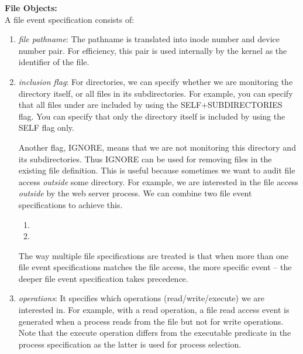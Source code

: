 

\noindent
{\bf File Objects:} \\
A file event specification consists of:
\begin{enumerate}

\item {\em file pathname}:
The pathname is translated into inode number and device number pair.
For efficiency, this pair is used internally by the kernel as
the identifier of the file.

\item {\em inclusion flag}:
For directories, we can specify whether
we are monitoring the directory itself, or all files in its subdirectories.
For example, you can specify that all files under 
are included by using the SELF+SUBDIRECTORIES flag.
You can specify that only the  directory itself
is included by using the SELF flag only.

Another flag, IGNORE, means that we
are not monitoring this directory and its subdirectories.
Thus IGNORE can be used for removing files in the existing file definition.
This is useful because sometimes we want to audit file access
{\em outside} some directory.
For example, we are interested in the file access {\em outside}
 by the web server process.
We can combine two file event specifications to achieve this.
\begin{enumerate}
\item {}
\item {}
\end{enumerate}

The way multiple file specifications are treated is that when
more than one file event specifications matches the file access,
the more specific event -- 
the deeper file event specification takes precedence.

\item {\em operations}:
It specifies which operations (read/write/execute) we are interested in.
For example, with a read operation, a file read access event
is generated when a process reads from the file but not for write operations.
Note that the execute operation differs from the executable 
predicate in the process specification as the latter is used for process
selection.


\end{enumerate}
